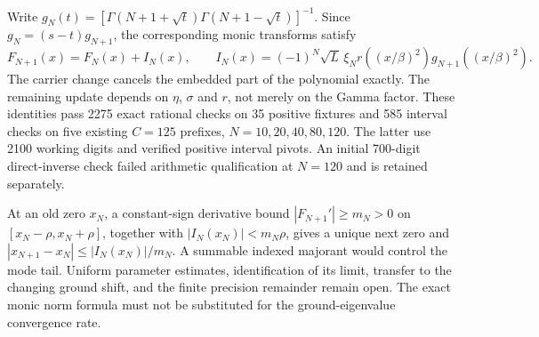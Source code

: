 Write $g_N(t)=[\Gamma(N+1+\sqrt t)\Gamma(N+1-\sqrt t)]^{-1}$.
Since $g_N=(s-t)g_{N+1}$, the corresponding monic transforms satisfy
\[
 F_{N+1}(x)=F_N(x)+I_N(x),\qquad
 I_N(x)=(-1)^N\sqrt L\,\xi_Nr((x/\beta)^2)g_{N+1}((x/\beta)^2).
\]
The carrier change cancels the embedded part of the polynomial
exactly. The remaining update depends on $\eta$, $\sigma$ and $r$,
not merely on the Gamma factor. These identities pass 2275 exact
rational checks on 35 positive fixtures and 585 interval checks on
five existing $C=125$ prefixes, $N=10,20,40,80,120$. The latter use
2100 working digits and verified positive interval pivots. An initial
700-digit direct-inverse check failed arithmetic qualification at
$N=120$ and is retained separately.

At an old zero $x_N$, a constant-sign derivative bound
$|F_{N+1}'|\ge m_N>0$ on $[x_N-\rho,x_N+\rho]$, together with
$|I_N(x_N)|<m_N\rho$, gives a unique next zero and
$|x_{N+1}-x_N|\le |I_N(x_N)|/m_N$. A summable indexed majorant
would control the mode tail. Uniform parameter estimates, identification
of its limit, transfer to the changing ground shift, and the finite
precision remainder remain open. The exact monic norm formula must
not be substituted for the ground-eigenvalue convergence rate.

